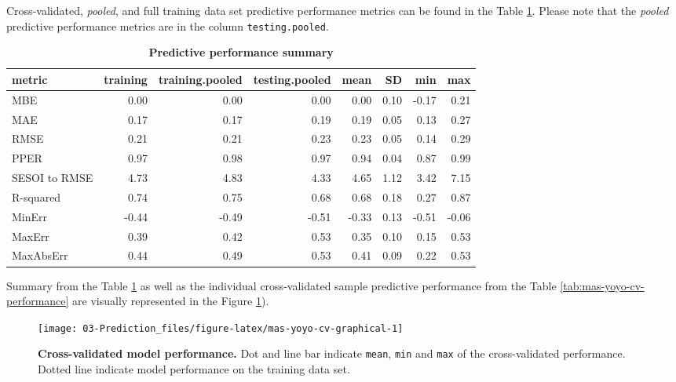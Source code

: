 \documentclass[
]{book}
\begin{document}
Cross-validated, \emph{pooled}, and full training data set predictive performance metrics can be found in the Table \ref{tab:mas-yoyo-cv-performance-summary}. Please note that the \emph{pooled} predictive performance metrics are in the column \texttt{testing.pooled}.



\begin{table}

\caption{\label{tab:mas-yoyo-cv-performance-summary}\textbf{Predictive performance summary}}
\centering
\begin{tabular}[t]{lrrrrrrr}
\toprule
metric & training & training.pooled & testing.pooled & mean & SD & min & max\\
\midrule
MBE & 0.00 & 0.00 & 0.00 & 0.00 & 0.10 & -0.17 & 0.21\\
MAE & 0.17 & 0.17 & 0.19 & 0.19 & 0.05 & 0.13 & 0.27\\
RMSE & 0.21 & 0.21 & 0.23 & 0.23 & 0.05 & 0.14 & 0.29\\
PPER & 0.97 & 0.98 & 0.97 & 0.94 & 0.04 & 0.87 & 0.99\\
SESOI to RMSE & 4.73 & 4.83 & 4.33 & 4.65 & 1.12 & 3.42 & 7.15\\
\addlinespace
R-squared & 0.74 & 0.75 & 0.68 & 0.68 & 0.18 & 0.27 & 0.87\\
MinErr & -0.44 & -0.49 & -0.51 & -0.33 & 0.13 & -0.51 & -0.06\\
MaxErr & 0.39 & 0.42 & 0.53 & 0.35 & 0.10 & 0.15 & 0.53\\
MaxAbsErr & 0.44 & 0.49 & 0.53 & 0.41 & 0.09 & 0.22 & 0.53\\
\bottomrule
\end{tabular}
\end{table}

Summary from the Table \ref{tab:mas-yoyo-cv-performance-summary} as well as the individual cross-validated sample predictive performance from the Table \ref{tab:mas-yoyo-cv-performance} are visually represented in the Figure \ref{fig:mas-yoyo-cv-graphical}).

\begin{figure}

{\centering \texttt{[image: 03-Prediction\_files/figure-latex/mas-yoyo-cv-graphical-1]} 

}

\caption{\textbf{Cross-validated model performance. }Dot and line bar indicate \texttt{mean}, \texttt{min} and \texttt{max} of the cross-validated performance. Dotted line indicate model performance on the training data set.}\label{fig:mas-yoyo-cv-graphical}
\end{figure}
\end{document}
